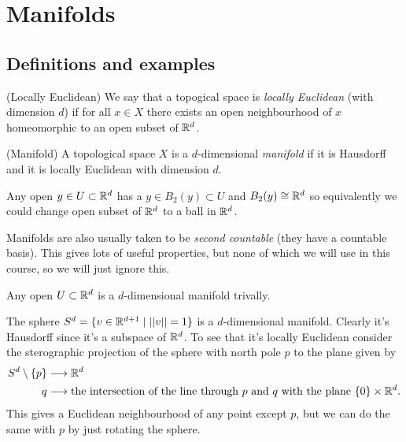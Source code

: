 \documentclass{article}
\begin{document}
\section{Manifolds}
\subsection{Definitions and examples}
\begin{definition}
	(Locally Euclidean) We say that a topogical space is \textit{locally Euclidean} (with dimension $ d $) if for all $ x\in X $ there exists an open neighbourhood of $ x $ homeomorphic to an open subset of $ \mathbb{R}^d $.
\end{definition}
\begin{definition}
	(Manifold) A topological space $ X $ is a $ d $-dimensional \textit{manifold} if it is Hausdorff and it is locally Euclidean with dimension $ d $.
\end{definition}
\begin{remark}
  Any open $ y\in U \subset \mathbb{R}^d $ has a $ y\in B_2(y)\subset U $ and $ B_2(y)\cong \mathbb{R}^d $ so equivalently we could change open subset of $ \mathbb{R}^d $ to a ball in $ \mathbb{R}^d $.
\end{remark}
\begin{remark}
	Manifolds are also usually taken to be \textit{second countable} (they have a countable basis). This gives lots of useful properties, but none of which we will use in this course, so we will just ignore this.
\end{remark}
\begin{example}
  Any open $ U\subset \mathbb{R}^d $ is a $ d $-dimensional manifold trivally.
\end{example}
\begin{example}
	The sphere $ S^d=\{v\in \mathbb{R}^{d+1} \mid ||v|| =1 \} $ is a $ d $-dimensional manifold. Clearly it's Hausdorff since it's a subspace of $ \mathbb{R}^d $. To see that it's locally Euclidean consider the sterographic projection of the sphere with north pole $ p $ to the plane given by
	\begin{align*}
		S^d \setminus \{p\} &\longrightarrow \mathbb{R}^d\\
		q &\longrightarrow \text{the intersection of the line through } p \text{ and } q \text{ with the plane } \{0\}\times \mathbb{R}^d.
	\end{align*}
	This gives a Euclidean neighbourhood of any point except $ p $, but we can do the same with $ p $ by just rotating the sphere.
\end{example}
\end{document}
